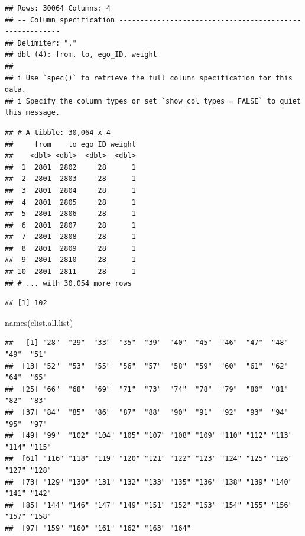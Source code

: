 \documentclass[
]{book}
\newenvironment{Shaded}{\begin{snugshade}}{\end{snugshade}}
\newcommand{\AttributeTok}[1]{\textcolor[rgb]{0.77,0.63,0.00}{#1}}
\newcommand{\CommentTok}[1]{\textcolor[rgb]{0.56,0.35,0.01}{\textit{#1}}}
\newcommand{\FunctionTok}[1]{\textcolor[rgb]{0.00,0.00,0.00}{#1}}
\newcommand{\NormalTok}[1]{#1}
\newcommand{\OtherTok}[1]{\textcolor[rgb]{0.56,0.35,0.01}{#1}}
\newcommand{\SpecialCharTok}[1]{\textcolor[rgb]{0.00,0.00,0.00}{#1}}
\begin{document}
\begin{verbatim}
## Rows: 30064 Columns: 4
## -- Column specification --------------------------------------------------------
## Delimiter: ","
## dbl (4): from, to, ego_ID, weight
## 
## i Use `spec()` to retrieve the full column specification for this data.
## i Specify the column types or set `show_col_types = FALSE` to quiet this message.
\end{verbatim}

\begin{verbatim}
## # A tibble: 30,064 x 4
##     from    to ego_ID weight
##    <dbl> <dbl>  <dbl>  <dbl>
##  1  2801  2802     28      1
##  2  2801  2803     28      1
##  3  2801  2804     28      1
##  4  2801  2805     28      1
##  5  2801  2806     28      1
##  6  2801  2807     28      1
##  7  2801  2808     28      1
##  8  2801  2809     28      1
##  9  2801  2810     28      1
## 10  2801  2811     28      1
## # ... with 30,054 more rows
\end{verbatim}

\begin{Shaded}
\end{Shaded}

\begin{verbatim}
## [1] 102
\end{verbatim}

\begin{Shaded}
\begin{Highlighting}[]
\FunctionTok{names}\NormalTok{(elist.all.list)}
\end{Highlighting}
\end{Shaded}

\begin{verbatim}
##   [1] "28"  "29"  "33"  "35"  "39"  "40"  "45"  "46"  "47"  "48"  "49"  "51" 
##  [13] "52"  "53"  "55"  "56"  "57"  "58"  "59"  "60"  "61"  "62"  "64"  "65" 
##  [25] "66"  "68"  "69"  "71"  "73"  "74"  "78"  "79"  "80"  "81"  "82"  "83" 
##  [37] "84"  "85"  "86"  "87"  "88"  "90"  "91"  "92"  "93"  "94"  "95"  "97" 
##  [49] "99"  "102" "104" "105" "107" "108" "109" "110" "112" "113" "114" "115"
##  [61] "116" "118" "119" "120" "121" "122" "123" "124" "125" "126" "127" "128"
##  [73] "129" "130" "131" "132" "133" "135" "136" "138" "139" "140" "141" "142"
##  [85] "144" "146" "147" "149" "151" "152" "153" "154" "155" "156" "157" "158"
##  [97] "159" "160" "161" "162" "163" "164"
\end{verbatim}
\end{document}
